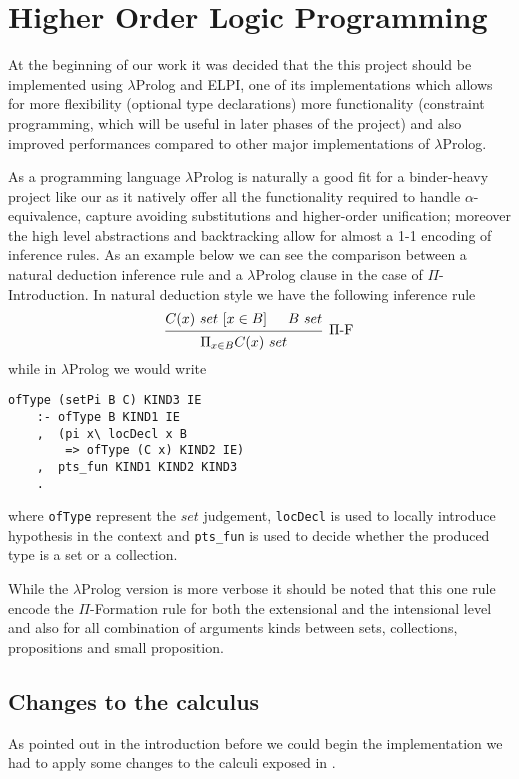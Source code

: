 
\section{Higher Order Logic Programming}

At the beginning of our work it was decided that the this project should be implemented using $\lambda$Prolog and ELPI, one of its implementations which allows for more flexibility (\eg optional type declarations) more functionality (\eg constraint programming, which will be useful in later phases of the project) and also improved performances compared to other major implementations of $\lambda$Prolog.

As a programming language $\lambda$Prolog is naturally a good fit for a binder-heavy project like our as it natively offer all the functionality required to handle $\alpha$-equiv\-a\-lence, capture avoiding substitutions and higher-order unification; moreover the high level abstractions and backtracking allow for almost a 1-1 encoding of inference rules. As an example  below we can see the comparison between a natural deduction inference rule and a $\lambda$Prolog clause in the case of $\Pi$-Introduction.
In natural deduction style we have the following inference rule
\[
\begin{prooftree}
\hypo{C(x)\ set\ [x \in B]}
\hypo{B\ set}
\infer{2}[\ensuremath{\Pi}-F]{\Pi_{x\in B}{C(x)}\ set}
\end{prooftree}\]
while in $\lambda$Prolog we would write
\begin{verbatim}
ofType (setPi B C) KIND3 IE
    :- ofType B KIND1 IE
    ,  (pi x\ locDecl x B
        => ofType (C x) KIND2 IE)
    ,  pts_fun KIND1 KIND2 KIND3
    .
\end{verbatim}
where \verb|ofType| represent the $set$ judgement, \verb|locDecl| is used to locally introduce hypothesis in the context and \verb|pts_fun| is used to decide whether the produced type is a set or a collection. 

While the $\lambda$Prolog version is more verbose it should be noted that this one rule encode the $\Pi$-Formation rule for both the extensional and the intensional level and also for all combination of arguments kinds between sets, collections, propositions and small proposition.

\subsection{Changes to the calculus}
As pointed out in the introduction before we could begin the implementation we had to apply some changes to the calculi exposed in \cite{maietti2009minimalist}.

